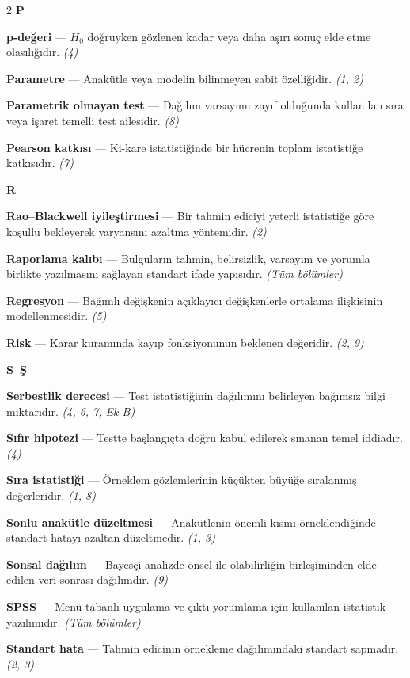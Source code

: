 \begin{multicols}{2}
\medskip
\noindent\textbf{\large P}\par\smallskip
\textbf{p-değeri} --- $H_0$ doğruyken gözlenen kadar veya daha aşırı sonuç elde etme olasılığıdır. \emph{(4)}\par
\textbf{Parametre} --- Anakütle veya modelin bilinmeyen sabit özelliğidir. \emph{(1, 2)}\par
\textbf{Parametrik olmayan test} --- Dağılım varsayımı zayıf olduğunda kullanılan sıra veya işaret temelli test ailesidir. \emph{(8)}\par
\textbf{Pearson katkısı} --- Ki-kare istatistiğinde bir hücrenin toplam istatistiğe katkısıdır. \emph{(7)}\par
\medskip
\noindent\textbf{\large R}\par\smallskip
\textbf{Rao--Blackwell iyileştirmesi} --- Bir tahmin ediciyi yeterli istatistiğe göre koşullu bekleyerek varyansını azaltma yöntemidir. \emph{(2)}\par
\textbf{Raporlama kalıbı} --- Bulguların tahmin, belirsizlik, varsayım ve yorumla birlikte yazılmasını sağlayan standart ifade yapısıdır. \emph{(Tüm bölümler)}\par
\textbf{Regresyon} --- Bağımlı değişkenin açıklayıcı değişkenlerle ortalama ilişkisinin modellenmesidir. \emph{(5)}\par
\textbf{Risk} --- Karar kuramında kayıp fonksiyonunun beklenen değeridir. \emph{(2, 9)}\par
\medskip
\noindent\textbf{\large S--Ş}\par\smallskip
\textbf{Serbestlik derecesi} --- Test istatistiğinin dağılımını belirleyen bağımsız bilgi miktarıdır. \emph{(4, 6, 7, Ek B)}\par
\textbf{Sıfır hipotezi} --- Testte başlangıçta doğru kabul edilerek sınanan temel iddiadır. \emph{(4)}\par
\textbf{Sıra istatistiği} --- Örneklem gözlemlerinin küçükten büyüğe sıralanmış değerleridir. \emph{(1, 8)}\par
\textbf{Sonlu anakütle düzeltmesi} --- Anakütlenin önemli kısmı örneklendiğinde standart hatayı azaltan düzeltmedir. \emph{(1, 3)}\par
\textbf{Sonsal dağılım} --- Bayesçi analizde önsel ile olabilirliğin birleşiminden elde edilen veri sonrası dağılımdır. \emph{(9)}\par
\textbf{SPSS} --- Menü tabanlı uygulama ve çıktı yorumlama için kullanılan istatistik yazılımıdır. \emph{(Tüm bölümler)}\par
\textbf{Standart hata} --- Tahmin edicinin örnekleme dağılımındaki standart sapmadır. \emph{(2, 3)}\par

\end{multicols}
